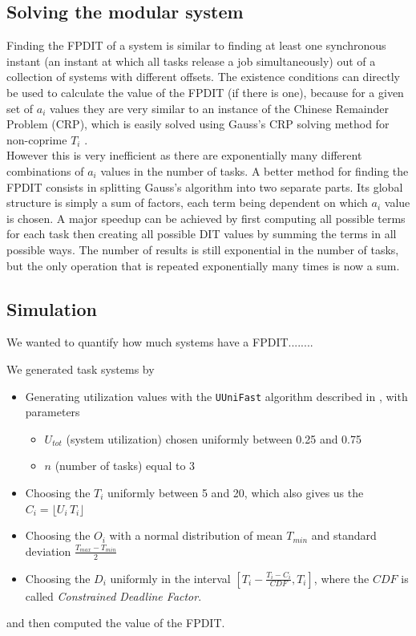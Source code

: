 \documentclass[times, 10pt,twocolumn, a4paper]{article}
\begin{document}
	\subsection{Solving the modular system}
		Finding the FPDIT of a system is similar to finding at least one synchronous
		instant (an instant at which all tasks release a job simultaneously) out of a
		collection of systems with different offsets. The existence conditions can
		directly be used to calculate the value of the FPDIT (if there is one),
		because for a given set of $a_i$ values they are very similar to an instance
		of the Chinese Remainder Problem (CRP), which is easily solved using Gauss's
		CRP solving method for non-coprime $T_i$ \cite{gauss1965disquisitiones}. \\

		However this is very inefficient as there are exponentially many different
		combinations of $a_i$ values in the number of tasks. A better method for finding the FPDIT consists in splitting Gauss's
		algorithm into two separate parts. Its global structure is simply a sum of
		factors, each term being dependent on which $a_i$ value is chosen. A major speedup can
		be achieved by first computing all possible terms for each task then creating all
		possible DIT values by summing the terms in all possible ways. The number of results is still
		exponential in the number of tasks, but the only operation that is repeated
		exponentially many times is now a sum.

	\subsection{Simulation}

	We wanted to quantify how much systems have a FPDIT........

	We generated task systems by
	\begin{itemize}
		\item Generating utilization values with the \texttt{UUniFast} algorithm described in \cite{bini2005measuring}, with parameters
		\begin{itemize}
			\item $U_{tot}$ (system utilization) chosen uniformly between 0.25 and 0.75
			\item $n$ (number of tasks) equal to 3
		\end{itemize}
		\item Choosing the $T_i$ uniformly between 5 and 20, which also gives us the $C_i = \lfloor U_i \, T_i \rfloor$
		\item Choosing the $O_i$ with a normal distribution of mean $T_{min}$ and standard deviation $\frac{T_{max} - T_{min}}{2}$
		\item Choosing the $D_i$ uniformly in the interval $[T_i - \frac{T_i - C_i}{CDF}, T_i]$, where the $CDF$ is called \emph{Constrained Deadline Factor}.
	\end{itemize}
	and then computed the value of the FPDIT.\\
\end{document}
